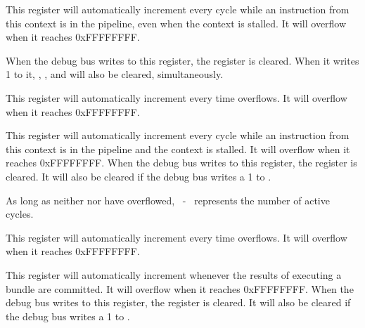 
This register will automatically increment every cycle while an instruction from
this context is in the pipeline, even when the context is stalled. It will
overflow when it reaches 0xFFFFFFFF.

When the debug bus writes to this register, the register is cleared. When it
writes 1 to it, , ,  and  will also be
cleared, simultaneously.

\debugCanWrite{}


This register will automatically increment every time  overflows. It
will overflow when it reaches 0xFFFFFFFF.

\debugCanWrite{}


This register will automatically increment every cycle while an instruction from
this context is in the pipeline and the context is stalled. It will overflow
when it reaches 0xFFFFFFFF. When the debug bus writes to this register, the
register is cleared. It will also be cleared if the debug bus writes a 1 to
.

As long as neither  nor  have overflowed,
~-~ represents the number of active cycles.

\debugCanWrite{}


This register will automatically increment every time  overflows. It
will overflow when it reaches 0xFFFFFFFF.

\debugCanWrite{}


This register will automatically increment whenever the results of executing a
bundle are committed. It will overflow when it reaches 0xFFFFFFFF. When
the debug bus writes to this register, the register is cleared. It will also be 
cleared if the debug bus writes a 1 to .

